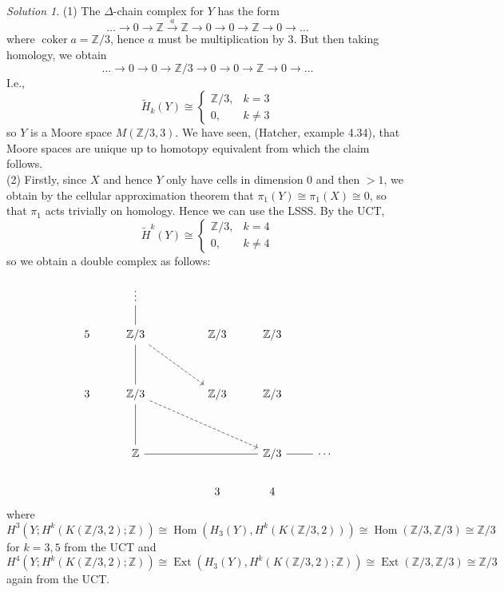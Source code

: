 \documentclass[reqno]{amsart}
\theoremstyle{definition}
\theoremstyle{remark}
\newtheorem*{solution}{Solution}
\DeclareMathOperator{\Hom}{Hom}
\DeclareMathOperator{\coker}{coker}
\DeclareMathOperator{\Ext}{Ext}
\begin{document}
    
    \begin{solution}
        (1) The $\Delta$-chain complex for $Y$ has the form
        \[
        \ldots \to 0 \to \mathbb{Z} \stackrel{a}{\to} \mathbb{Z}
        \to  0 \to  0 \to \mathbb{Z} \to  0 \to  \ldots
        \] 
        where $\coker a = \mathbb{Z}/3$, hence
        $a$ must be multiplication by $3$.
        But then taking homology, we obtain
        \[
       \ldots \to 
       0 \to 0 \to \mathbb{Z} /3 \to 0 \to  0 \to \mathbb{Z} \to 0
       \to \ldots
        \] 
        I.e.,
        \[
        \tilde{H}_k(Y) \cong
        \begin{cases}
            \mathbb{Z}/3,& k=3\\
            0,& k\neq 3
        \end{cases}
        \] 
        so $Y$ is a Moore space
        $M(\mathbb{Z}/3, 3)$.
        We have seen, (Hatcher, example 4.34), that
        Moore spaces are unique up to homotopy equivalent from
        which the claim follows.\\
        \linebreak
        (2) 
        Firstly, since
        $X$ and hence $Y$ only have
        cells in dimension $0$ and then
        $>1$, we obtain by the cellular approximation theorem
        that $\pi_1(Y) \cong \pi_1(X) \cong 0$, so
        that $\pi_1$ acts trivially on homology.
        Hence we can use the LSSS.
        By the UCT, 
        \[
        \tilde{H}^{k}(Y)
        \cong
        \begin{cases}
            \mathbb{Z}/3,& k=4\\
            0,& k\neq 4
        \end{cases}
        \] 
        so we obtain a double complex as follows:



\[\begin{tikzcd}
	& \vdots \\
	5 & {\mathbb{Z}/3} && {\mathbb{Z}/3} & {\mathbb{Z}/3} \\
	\\
	3 & {\mathbb{Z}/3} && {\mathbb{Z}/3} & {\mathbb{Z}/3} \\
	\\
	& {\mathbb{Z}} &&& {\mathbb{Z}/3} & \cdots \\
	&&& 3 & 4
	\arrow[no head, from=2-2, to=1-2]
	\arrow[dashed, from=2-2, to=4-4]
	\arrow[no head, from=4-2, to=2-2]
	\arrow[dashed, from=4-2, to=6-5]
	\arrow[no head, from=6-2, to=4-2]
	\arrow[no head, from=6-2, to=6-5]
	\arrow[no head, from=6-5, to=6-6]
\end{tikzcd}\]
where
$H^{3}\left( Y; H^{k}\left( K\left( \mathbb{Z}/3,2 \right) ;
\mathbb{Z} \right)  \right) 
\cong \Hom \left( H_3(Y) ,
H^{k} \left( K\left( \mathbb{Z}/3,2 \right)  \right) \right) \cong
\Hom \left( \mathbb{Z}/3, \mathbb{Z}/3 \right) 
\cong \mathbb{Z}/3$ for $k=3,5$ from the UCT and
$H^{4}\left( Y; H^{k}\left( 
K\left( \mathbb{Z}/3,2 \right) ; \mathbb{Z}\right)  \right) 
\cong \Ext \left( H_{3}(Y),
H^{k}\left( K\left( \mathbb{Z}/3,2 \right) ;\mathbb{Z}
\right) \right) \cong
\Ext \left( \mathbb{Z}/3, \mathbb{Z}/3 \right) 
\cong \mathbb{Z}/3$ again from the UCT.\\


\end{solution}
\end{document}

